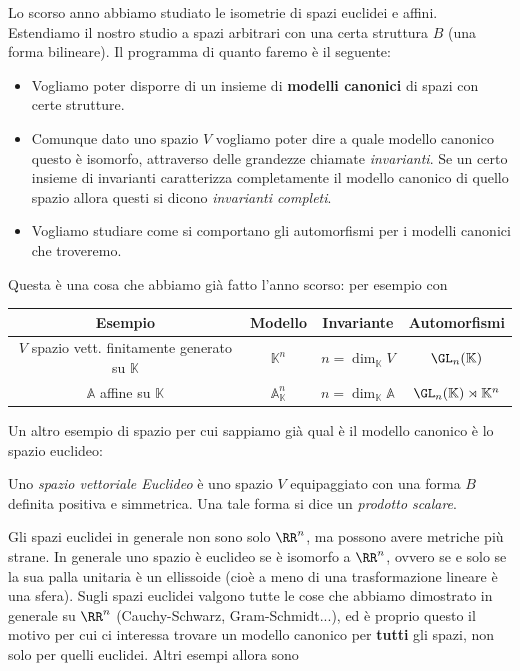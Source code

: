\documentclass[11pt]{scrartcl}
\renewcommand{\AA}{\mathbb{A}}
\newcommand{\KK}{\mathbb{K}}
\begin{document}
	Lo scorso anno abbiamo studiato le isometrie di spazi euclidei e affini. Estendiamo il nostro studio a spazi arbitrari con una certa struttura $B$ (una forma bilineare). Il programma di quanto faremo è il seguente:
	\begin{itemize}
		\item Vogliamo poter disporre di un insieme di \textbf{modelli canonici} di spazi con certe strutture.
		\item Comunque dato uno spazio $V$ vogliamo poter dire a quale modello canonico questo è isomorfo, attraverso delle grandezze chiamate \textit{invarianti}. Se un certo insieme di invarianti caratterizza completamente il modello canonico di quello spazio allora questi si dicono \textit{invarianti completi}.
		\item Vogliamo studiare come si comportano gli automorfismi per i modelli canonici che troveremo.
	\end{itemize}
	Questa è una cosa che abbiamo già fatto l'anno scorso: per esempio con
	\begin{center}
		\begin{tabular}{|c|c|c|c|}
			\hline
			Esempio & Modello & Invariante & Automorfismi \\
			\hline
			$V$ spazio vett. finitamente generato su $\KK$ & $\KK^n$ & $n=\dim_\KK V$ & $\GL_n(\KK)$ \\
			\hline
			$\AA$ affine su $\KK$ & $\AA^n_\KK$ & $n=\dim_\KK\AA$ & $\GL_n(\KK)\rtimes \KK^n$ \\
			\hline
		\end{tabular}
	\end{center}
	Un altro esempio di spazio per cui sappiamo già qual è il modello canonico è lo spazio euclideo:
	\begin{definition}
		Uno \textit{spazio vettoriale Euclideo} è uno spazio $V$ equipaggiato con una forma $B$ definita positiva e simmetrica. Una tale forma si dice un \textit{prodotto scalare}.
	\end{definition}
	Gli spazi euclidei in generale non sono solo $\RR^n$, ma possono avere metriche più strane. In generale uno spazio è euclideo se è isomorfo a $\RR^n$, ovvero se e solo se la sua palla unitaria è un ellissoide (cioè a meno di una trasformazione lineare è una sfera). Sugli spazi euclidei valgono tutte le cose che abbiamo dimostrato in generale su $\RR^n$ (Cauchy-Schwarz, Gram-Schmidt...), ed è proprio questo il motivo per cui ci interessa trovare un modello canonico per \textbf{tutti} gli spazi, non solo per quelli euclidei. Altri esempi allora sono
\end{document}
